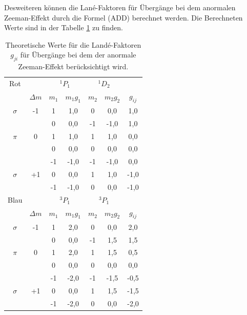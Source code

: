 Desweiteren können die Lané-Faktoren für Übergänge
bei dem anormalen Zeeman-Effekt durch die Formel (ADD) berechnet werden.
Die Berechneten Werte sind in der Tabelle \ref{tab:theo2}
zu finden.

\begin{table}
  \centering
  \caption{Theoretische Werte für die Landé-Faktoren $g_{ji}$ für Übergänge bei
  dem der anormale Zeeman-Effekt berücksichtigt wird.}
  \label{tab:theo2}
\begin{tabular}{c c c c c c c}
  \toprule
Rot      &            &  \multicolumn{2}{c}{$^1P_1$}  & \multicolumn{2}{c}{$^1D_2$} &    \\
      & $\Delta m$ &   $m_1$&  $m_1g_1$            & $m_2$    & $m_2g_2$         & $g_{ij}$\\
\midrule
$\sigma$ &  -1   &    1 &  1,0     &  0  & 0,0  &  1,0  \\
       &       &    0 &  0,0     & -1  & -1,0  &  1,0  \\
$\pi$    &   0   &    1 &  1,0     &  1  &  1,0  &  0,0  \\
       &       &    0 &  0,0     &  0  & 0,0  &  0,0  \\
       &       &   -1 & -1,0     & -1  & -1,0 &  0,0 \\
$\sigma$ &  +1   &    0 &  0,0     &  1  & 1,0  & -1,0  \\
       &       &   -1 & -1,0     &  0  & 0,0  & -1,0  \\
\midrule
\midrule
Blau &            &  \multicolumn{2}{c}{$^3P_1$}  & \multicolumn{2}{c}{$^3P_1$} &    \\
& $\Delta m$ &   $m_1$&  $m_1g_1$            & $m_2$    & $m_2g_2$         & $g_{ij}$\\
  \midrule
$\sigma$ &  -1   &    1 &  2,0     &  0  & 0,0  &  2,0  \\
       &       &    0 &  0,0     & -1  & 1,5  &  1,5  \\
$\pi $   &   0   &    1 &  2,0     &  1  & 1,5  &  0,5  \\
       &       &    0 &  0,0     &  0  & 0,0  &  0,0  \\
       &       &   -1 & -2,0     & -1  & -1,5 & -0,5  \\
$\sigma$ &  +1   &    0 &  0,0     &  1  & 1,5  & -1,5  \\
       &       &   -1 & -2,0     &  0  & 0,0  & -2,0  \\
\bottomrule
\end{tabular}
\end{table}

